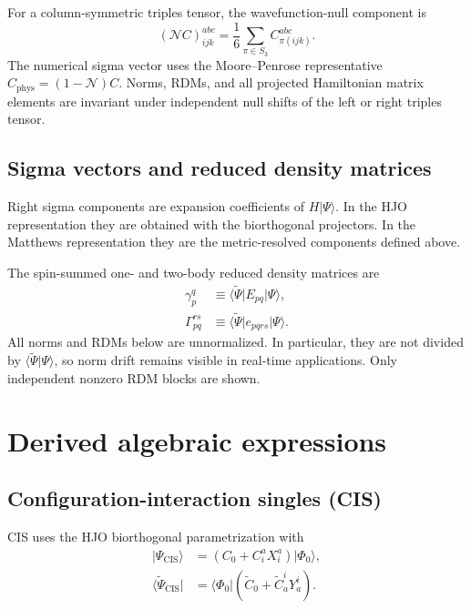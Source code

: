 \documentclass[10pt]{article}
\numberwithin{equation}{section}
\newcommand{\vac}{\Phi_0}
\begin{document}
\begingroup
\small

\endgroup

For a column-symmetric triples tensor, the wavefunction-null component is
\begin{equation}
 (\mathcal N C)_{ijk}^{abc}
 =\frac16\sum_{\pi\in S_3}C_{\pi(ijk)}^{abc}.
\end{equation}
The numerical sigma vector uses the Moore--Penrose representative
$C_{\mathrm{phys}}=(1-\mathcal N)C$.  Norms, RDMs, and all projected
Hamiltonian matrix elements are invariant under independent null shifts of
the left or right triples tensor.

\subsection{Sigma vectors and reduced density matrices}

Right sigma components are expansion coefficients of
$H\lvert\Psi\rangle$.  In the HJO representation they are obtained with the
biorthogonal projectors.  In the Matthews representation they are the
metric-resolved components defined above.

The spin-summed one- and two-body reduced density matrices are
\begin{align}
 \gamma_p^q
 &\equiv\langle\widetilde\Psi\rvert E_{pq}\lvert\Psi\rangle,
 \\
 \Gamma_{pq}^{rs}
 &\equiv\langle\widetilde\Psi\rvert e_{pqrs}\lvert\Psi\rangle.
\end{align}
All norms and RDMs below are unnormalized.  In particular, they are not
divided by $\langle\widetilde\Psi\vert\Psi\rangle$, so norm drift remains
visible in real-time applications.  Only independent nonzero RDM blocks are
shown.

\clearpage
\section{Derived algebraic expressions}

\subsection{Configuration-interaction singles (CIS)}

CIS uses the HJO biorthogonal parametrization with
\begin{align}
 \lvert\Psi_{\mathrm{CIS}}\rangle
 &=\left(C_0+C_i^aX_i^a\right)\lvert\vac\rangle,
 \\
 \langle\widetilde\Psi_{\mathrm{CIS}}\rvert
 &=\langle\vac\rvert\left(\widetilde C_0+\widetilde C_a^iY_a^i\right).
\end{align}
\end{document}
